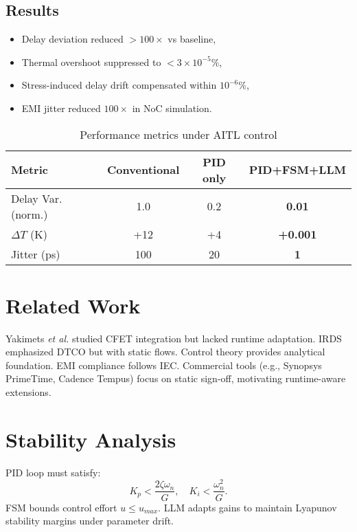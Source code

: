 \documentclass[conference]{IEEEtran}
\begin{document}
\subsection{Results}
\begin{itemize}
  \item Delay deviation reduced $>100\times$ vs baseline,
  \item Thermal overshoot suppressed to $<3\times 10^{-5}\%$,
  \item Stress-induced delay drift compensated within $10^{-6}\%$,
  \item EMI jitter reduced $100\times$ in NoC simulation.
\end{itemize}

\begin{table}[!b]
\centering
\caption{Performance metrics under AITL control}
\label{tab:perf}
\begin{tabular}{lccc}
\hline
Metric & Conventional & PID only & PID+FSM+LLM \\
\hline
Delay Var. (norm.) & 1.0 & 0.2 & \textbf{0.01} \\
$\Delta T$ (K)     & +12 & +4  & \textbf{+0.001} \\
Jitter (ps)        & 100 & 20  & \textbf{1} \\
\hline
\end{tabular}
\end{table}

\section{Related Work}
Yakimets \textit{et al.} studied CFET integration but lacked runtime adaptation.
IRDS emphasized DTCO but with static flows.
Control theory provides analytical foundation.
EMI compliance follows IEC.
Commercial tools (e.g., Synopsys PrimeTime, Cadence Tempus) focus on static sign-off, motivating runtime-aware extensions.

\section{Stability Analysis}
PID loop must satisfy:
\begin{equation}
K_p < \frac{2\zeta\omega_n}{G}, \quad K_i < \frac{\omega_n^2}{G}.
\end{equation}
FSM bounds control effort $u \le u_{max}$.
LLM adapts gains to maintain Lyapunov stability margins under parameter drift.
\end{document}

